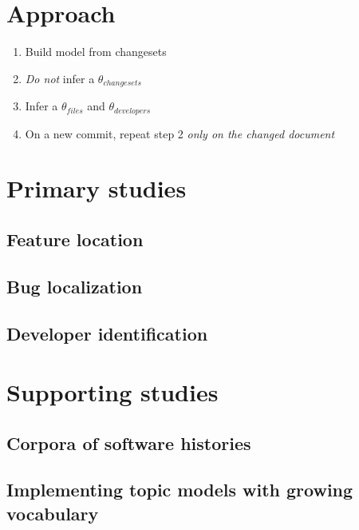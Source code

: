 \section{Approach}\label{approach}

\begin{enumerate}
\def\labelenumi{\arabic{enumi}.}
\itemsep1pt\parskip0pt
\item
  Build model from changesets
\item
  \emph{Do not} infer a $\theta_{changesets}$
\item
  Infer a $\theta_{files}$ and $\theta_{developers}$
\item
  On a new commit, repeat step 2 \emph{only on the changed document}
\end{enumerate}

\section{Primary studies}\label{primary-studies}

\subsection{Feature location}\label{feature-location}

\subsection{Bug localization}\label{bug-localization}

\subsection{Developer identification}\label{developer-identification}

\section{Supporting studies}\label{supporting-studies}

\subsection{Corpora of software
histories}\label{corpora-of-software-histories}

\subsection{Implementing topic models with growing
vocabulary}\label{implementing-topic-models-with-growing-vocabulary}
